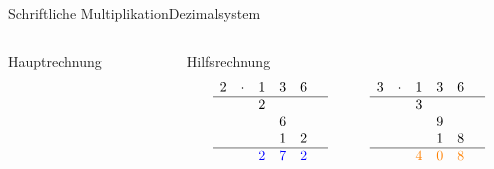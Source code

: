 \documentclass[xelatex,aspectratio=169]{beamer}
\begin{document}
\begin{frame}[t]{Schriftliche Multiplikation}{Dezimalsystem}
{\begin{columns}
\begin{column}{0.33\textwidth}
\begin{block}{Hauptrechnung}
        \end{block}
      \end{column}
      \begin{column}{0.67\textwidth}
        \begin{block}{Hilfsrechnung}
          \[
            \begin{matrix}
              2 & \cdot & 1                   & 3                   & 6                     \\
              \hline
                &       & 2                   &                     &                     & \\
                &       &                     & 6                   &                       \\
                &       &                     & 1                   & 2                     \\
              \hline
                &       & \textcolor{blue}{2} & \textcolor{blue}{7} & \textcolor{blue}{2}   \\
            \end{matrix} \qquad\qquad \begin{matrix}
              3 & \cdot & 1                     & 3                     & 6                       \\
              \hline
                &       & 3                     &                       &                       & \\
                &       &                       & 9                     &                         \\
                &       &                       & 1                     & 8                       \\
              \hline
                &       & \textcolor{orange}{4} & \textcolor{orange}{0} & \textcolor{orange}{8}   \\
            \end{matrix}
          \]
        \end{block}
      \end{column}
    \end{columns}
  }
\end{frame}
\end{document}

